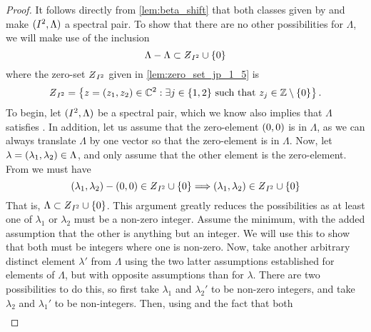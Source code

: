 \documentclass[../thesis.tex]{subfiles}
\begin{document}
\begin{proof}
    It follows directly from \cref{lem:beta_shift} that both classes given by  and  make $(I^2,\Lambda)$ a spectral pair. To show that there are no other possibilities for $\Lambda$, we will make use of the inclusion
    \begin{equation}\label{eq:inclusion_dim_2}
        \Lambda - \Lambda \subset \Zstroke_{I^2} \cup \braq{0}
    \end{equation}
    where the zero-set $\Zstroke_{I^2}$ given in \cref{lem:zero_set_jp_1_5} is
    \begin{equation}\label{eq:zeroset_dim_2}
        \Zstroke_{I^2} = \braqMed{z = \brac{z_1,z_2} \in \C^2 : \exists \space j \in \braq{1,2} \text{ such that } z_j \in \intnozero}.
    \end{equation}
    To begin, let $(I^2,\Lambda)$ be a spectral pair, which we know also implies that $\Lambda$ satisfies . In addition, let us assume that the zero-element $(0,0)$ is in $\Lambda$, as we can always translate $\Lambda$ by one vector so that the zero-element is in $\Lambda$. Now, let $\lambda = (\lambda_1,\lambda_2) \in \Lambda$, and only assume that the other element is the zero-element. From  we must have
    \begin{equation*}%
        \brac{\lambda_1, \lambda_2} - \brac{0,0} \in \Zstroke_{I^2} \cup \braq{0} \Longrightarrow \brac{\lambda_1, \lambda_2} \in \Zstroke_{I^2} \cup \braq{0}
    \end{equation*}
    That is, $\Lambda \subset \Zstroke_{I^2} \cup \braq{0}$. This argument greatly reduces the possibilities as at least one of $\lambda_1$ or $\lambda_2$ must be a non-zero integer. Assume the minimum, with the added assumption that the other is anything but an integer. We will use this to show that both must be integers where one is non-zero. Now, take another arbitrary distinct element $\lambda'$ from $\Lambda$ using the two latter assumptions established for elements of $\Lambda$, but with opposite assumptions than for $\lambda$. There are two possibilities to do this, so first take $\lambda_1$ and $\lambda_2'$ to be non-zero integers, and take $\lambda_2$ and $\lambda_1'$ to be non-integers. Then, using   and the fact that both 
    \begin{align*}

\end{align*}
\end{proof}
\end{document}
